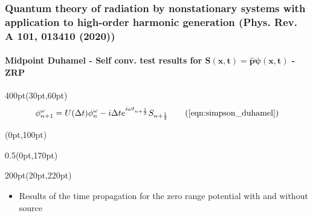 

\begin{frame}
\frametitle{Quantum theory of radiation by nonstationary systems 
	with application to high-order harmonic generation
        (Phys. Rev. A 101, 013410 (2020))}
	\framesubtitle{Midpoint Duhamel - 
	Self conv. test results for 
	$\mathbf{S(x,t) = \hat{p}\psi(x,t)}$ - ZRP }
\footnotesize
\begin{textblock*}{400pt}(30pt,60pt)
	\begin{equation}
		\phi^\omega_{n+1} = U(\Delta t) \phi^\omega_{n}
		- i\Delta t
		e^{i\omega t_{n+\frac{1}{2}}} S_{n+\frac{1}{2}}
		 \tag{\ref{eqn:simpson_duhamel}}
	\end{equation}
\end{textblock*}

\footnotesize
\begin{textblock*}{\linewidth}(0pt,100pt)
\end{textblock*}
\begin{textblock*}{0.5\linewidth}(0pt,170pt)
\end{textblock*}


\begin{textblock*}{200pt}(20pt,220pt)
	\begin{itemize}
	 \item Results of the time propagation for the zero range potential
		 with and without source
	\end{itemize}
\end{textblock*}



\end{frame}
